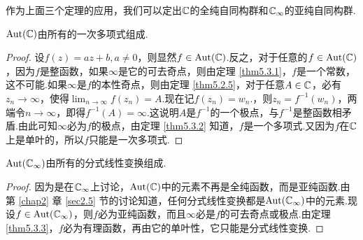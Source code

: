 作为上面三个定理的应用，我们可以定出$\mathbb C$的全纯自同构群和$\mathbb C_\infty$的亚纯自同构群.
\begin{theorem}\label{thm5.3.4}
  $\operatorname{Aut}(\mathbb C)$由所有的一次多项式组成.
\end{theorem}
\begin{proof}
  设$f(z)=az+b,a\ne0$，则显然$f\in \operatorname{Aut}(\mathbb C)$.反之，对于任意的$f\in \operatorname{Aut}(\mathbb C)$，因为$f$是整函数，如果$\infty$是它的可去奇点，则由定理 \ref{thm5.3.1}，$f$是一个常数，这不可能.如果$\infty$是$f$的本性奇点，则由定理 \ref{thm5.2.5}，对于任意$A\in\mathbb C$，必有$z_n\to\infty$，使得$\lim_{n\to\infty}f(z_n)=A$.现在记$f(z_n)=w_n$.，则$z_n=f^{-1}(w_n)$，两端令$n\to\infty$，即得$f^{-1}(A)=\infty$.这说明$A$是$f^{-1}$的一个极点，与$f^{-1}$是整函数相矛盾.由此可知$\infty$必为$f$的极点，由定理 \ref{thm5.3.2} 知道，$f$是一个多项式.又因为$f$在$\mathbb C$上是单叶的，所以$f$只能是一次多项式.
\end{proof}

\begin{theorem}\label{thm5.3.5}
  $\operatorname{Aut}(\mathbb C_\infty)$由所有的分式线性变换组成.
\end{theorem}
\begin{proof}
  因为是在$\mathbb C_\infty$上讨论，$\operatorname{Aut}(\mathbb C)$中的元素不再是全纯函数，而是亚纯函数.由第 \ref{chap2} 章 \ref{sec2.5} 节的讨论知道，任何分式线性变换都是$\operatorname{Aut}(\mathbb C_\infty)$中的元素.现设$f\in\operatorname{Aut}(\mathbb C_\infty)$，则$f$必为亚纯函数，而且$\infty$必是$f$的可去奇点或极点.由定理 \ref{thm5.3.3}，$f$必为有理函数，再由它的单叶性，它只能是分式线性变换.
\end{proof}

